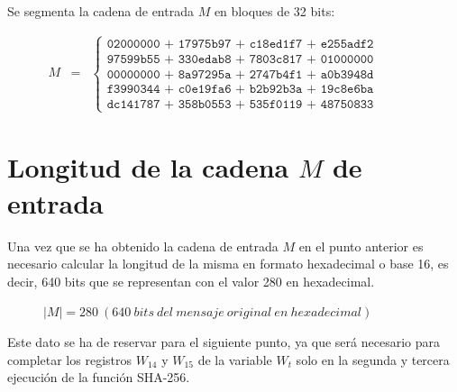 \documentclass{article}
\begin{document}
    Se segmenta la cadena de entrada $M$ en bloques de 32 bits:
    \begin{figure}[H]
    \centering
        $\begin{array}{rcl}
             M & = & \left \{
            \begin{array}{c}
                \texttt{02000000 + 17975b97 + c18ed1f7 + e255adf2} \\
                \texttt{97599b55 + 330edab8 + 7803c817 + 01000000} \\
                \texttt{00000000 + 8a97295a + 2747b4f1 + a0b3948d} \\
                \texttt{f3990344 + c0e19fa6 + b2b92b3a + 19c8e6ba} \\
                \texttt{dc141787 + 358b0553 + 535f0119 + 48750833}
            \end{array}
            \right .
        \end{array}$
    \end{figure}

\section{Longitud de la cadena $M$ de entrada}
    Una vez que se ha obtenido la cadena de entrada $M$ en el punto anterior es necesario calcular la longitud de la misma en formato hexadecimal o base 16, es decir, 640 bits que se representan con el valor 280 en hexadecimal.
    \begin{figure}[H]
    \centering
        $|M| = 280\ (640\ bits\ del\ mensaje\ original\ en\ hexadecimal)$
    \end{figure}
    Este dato se ha de reservar para el siguiente punto, ya que será necesario para completar los registros $W_{14}$ y $W_{15}$ de la variable $W_t$ solo en la segunda y tercera ejecución de la función SHA-256.
    
\end{document}
